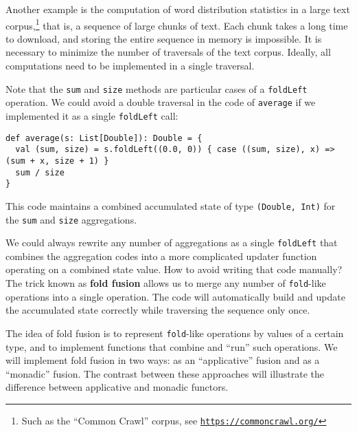 Another example is the computation of word distribution statistics
in a large text corpus,\footnote{Such as the \textsf{``}Common Crawl\textsf{''} corpus, see \texttt{\href{https://commoncrawl.org/}{https://commoncrawl.org/}}}
that is, a sequence of large chunks of text. Each chunk takes a long
time to download, and storing the entire sequence in memory is impossible.
It is necessary to minimize the number of traversals of the text corpus.
Ideally, all computations need to be implemented in a single traversal.

Note that the \lstinline!sum! and \lstinline!size! methods are particular
cases of a \lstinline!foldLeft! operation. We could avoid a double
traversal in the code of \lstinline!average! if we implemented it
as a single \lstinline!foldLeft! call:
\begin{lstlisting}
def average(s: List[Double]): Double = {
  val (sum, size) = s.foldLeft((0.0, 0)) { case ((sum, size), x) => (sum + x, size + 1) }
  sum / size
}
\end{lstlisting}
This code maintains a combined accumulated state of type \lstinline!(Double, Int)!
for the \lstinline!sum! and \lstinline!size! aggregations. 

We could always rewrite any number of aggregations as a single \lstinline!foldLeft!
that combines the aggregation codes into a more complicated updater
function operating on a combined state value. How to avoid writing
that code manually? The trick known as \textbf{fold fusion}
allows us to merge any number of \lstinline!fold!-like operations
into a single operation. The code will automatically build and update
the accumulated state correctly while traversing the sequence only
once.

The idea of fold fusion is to represent \lstinline!fold!-like operations
by values of a certain type, and to implement functions that combine
and \textsf{``}run\textsf{''} such operations. We will implement fold fusion in two
ways: as an \textsf{``}applicative\textsf{''} fusion and as a \textsf{``}monadic\textsf{''} fusion.
The contrast between these approaches will illustrate the difference
between applicative and monadic functors.

